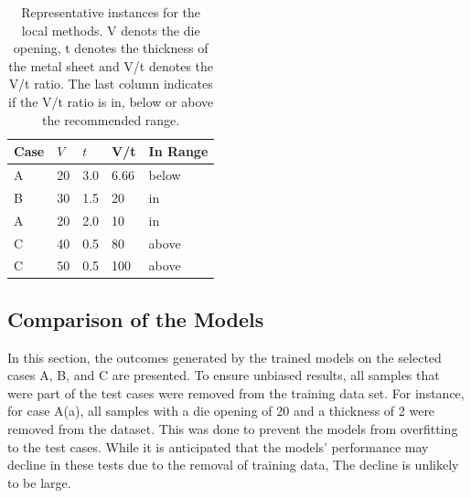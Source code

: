 \begin{table}[h]
    \begin{tcolorbox}[arc=0pt,boxrule=0.5pt]
        \centering
        \begin{tabular}{lllll}
            \toprule
            \textbf{Case} & \textbf{\(V\) } & \textbf{\(t\)} & \textbf{V/t} & \textbf{In Range} \\
            \toprule
            A             & 20              & 3.0            & 6.66         & below             \\
            \hdashline
            B             & 30              & 1.5            & 20           & in                \\
            A             & 20              & 2.0            & 10           & in                \\
            \hdashline
            C             & 40              & 0.5            & 80           & above             \\
            C             & 50              & 0.5            & 100          & above             \\
            \bottomrule
        \end{tabular}
    \end{tcolorbox}
    \caption{Representative instances for the local methods.
    V denots the die opening, t denotes the thickness of the metal sheet and V/t denotes the V/t ratio.
    The last column indicates if the V/t ratio is in, below or above the recommended range.}
    \label{tab:representative-instances}
\end{table}

\subsection{Comparison of the Models}\label{subsec:overall-comparison-model-performance}
In this section, the outcomes generated by the trained models on the selected cases A, B, and C are presented. To
ensure unbiased results, all samples that were part of the test cases were removed from the training data set.
For instance, for case A(a), all samples with a die opening of 20 and a thickness of 2 were removed from the dataset.
This was done to prevent the models from overfitting to the test cases.
While it is anticipated that the models' performance may decline in these tests due to the removal of training data,
The decline is unlikely to be large.

